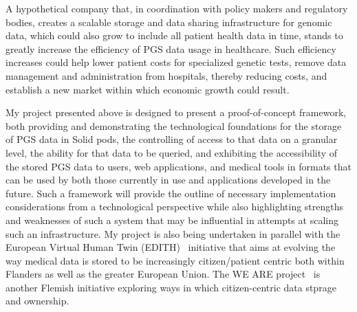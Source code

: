 \documentclass[a4paper,11pt]{article}
\begin{document}
\begin{refsection}
A hypothetical company that, in coordination with policy makers and regulatory bodies, creates a scalable storage and data sharing infrastructure for genomic data, which could also grow to include all patient health data in time, stands to greatly increase the efficiency of PGS data usage in healthcare. 
Such efficiency increases could help lower patient costs for specialized genetic tests, remove data management and administration from hospitals, thereby reducing costs, and establish a new market within which economic growth could result. 

My project presented above is designed to present a proof-of-concept framework, both providing and demonstrating the technological foundations for the storage of PGS data in Solid pods, the controlling of access to that data on a granular level, the ability for that data to be queried, and exhibiting the accessibility of the stored PGS data to users, web applications, and medical tools in formats that can be used by both those currently in use and applications developed in the future. 
Such a framework will provide the outline of necessary implementation considerations from a technological perspective while also highlighting strengths and weaknesses of such a system that may be influential in attempts at scaling such an infrastructure. 
My project is also being undertaken in parallel with the European Virtual Human Twin (EDITH)~\cite{edith} initiative that aims at evolving the way medical data is stored to be increasingly citizen/patient centric both within Flanders as well as the greater European Union. 
The WE ARE project~\cite{weare} is another Flemish initiative exploring ways in which citizen-centric data stprage and ownership.



\end{refsection}
\end{document}
